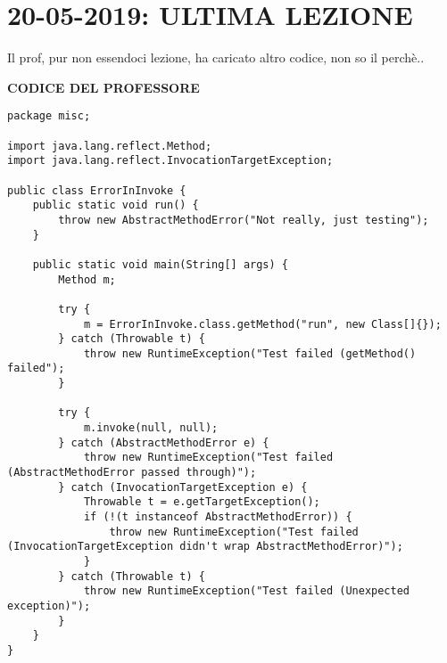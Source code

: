 \newpage
\section{20-05-2019: ULTIMA LEZIONE}
\noindent Il prof, pur non essendoci lezione, ha caricato altro codice, non so il perchè.. \newline

\noindent \textbf{CODICE DEL PROFESSORE} \newline


\begin{lstlisting}
package misc;

import java.lang.reflect.Method;
import java.lang.reflect.InvocationTargetException;

public class ErrorInInvoke {
    public static void run() {
        throw new AbstractMethodError("Not really, just testing");
    }

    public static void main(String[] args) {
        Method m;

        try {
            m = ErrorInInvoke.class.getMethod("run", new Class[]{});
        } catch (Throwable t) {
            throw new RuntimeException("Test failed (getMethod() failed");
        }

        try {
            m.invoke(null, null);
        } catch (AbstractMethodError e) {
            throw new RuntimeException("Test failed (AbstractMethodError passed through)");
        } catch (InvocationTargetException e) {
            Throwable t = e.getTargetException();
            if (!(t instanceof AbstractMethodError)) {
                throw new RuntimeException("Test failed (InvocationTargetException didn't wrap AbstractMethodError)");
            }
        } catch (Throwable t) {
            throw new RuntimeException("Test failed (Unexpected exception)");
        }
    }
}
\end{lstlisting}


